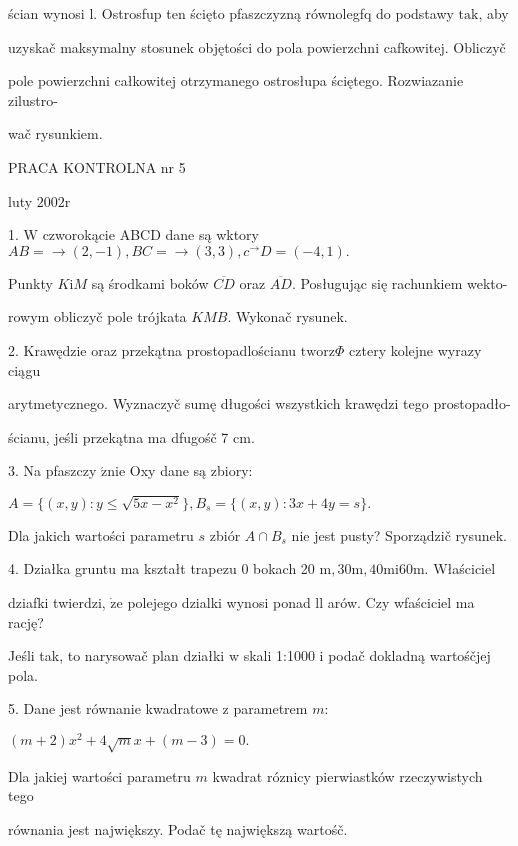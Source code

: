 \documentclass[a4paper,12pt]{article}
\begin{document}
ścian wynosi l. Ostrosfup ten ścięto pfaszczyzną równolegfq do podstawy $\mathrm{t}\mathrm{a}\mathrm{k}$, aby

uzyskač maksymalny stosunek objętości do pola powierzchni cafkowitej. Obliczyč

pole powierzchni całkowitej otrzymanego ostrosłupa ściętego. Rozwiazanie zilustro-

wač rysunkiem.





PRACA KONTROLNA nr 5

luty $2002\mathrm{r}$

1. $\mathrm{W}$ czworokącie ABCD dane są wktory $AB=\rightarrow(2,-1), BC=\rightarrow(3,3), c^{\rightarrow}D=(-4,1).$

Punkty $K\mathrm{i}M$ są środkami boków $\overline{CD}$ oraz $\overline{AD}$. Posługując się rachunkiem wekto-

rowym obliczyč pole trójkata $KMB$. Wykonač rysunek.

2. Krawędzie oraz przekątna prostopadlościanu $\mathrm{t}\mathrm{w}\mathrm{o}\mathrm{r}\mathrm{z}\Phi$ cztery kolejne wyrazy ciągu

arytmetycznego. Wyznaczyč sumę długości wszystkich krawędzi tego prostopadło-

ścianu, jeśli przekątna ma dfugośč 7 cm.

3. Na pfaszczy $\acute{\mathrm{z}}\mathrm{n}\mathrm{i}\mathrm{e}$ Oxy dane są zbiory:

$A=\{(x,y):y\leq\sqrt{5x-x^{2}}\},B_{s}=\{(x,y):3x+4y=s\}.$

Dla jakich wartości parametru $s$ zbiór $A\cap B_{s}$ nie jest pusty? Sporządzič rysunek.

4. Działka gruntu ma kształt trapezu $0$ bokach 20 $\mathrm{m}, 30\mathrm{m}, 40\mathrm{m}\mathrm{i}60\mathrm{m}$. Właściciel

dziafki twierdzi, $\dot{\mathrm{z}}\mathrm{e}$ polejego dzialki wynosi ponad ll arów. Czy wfaściciel ma rację?

Jeśli tak, to narysowač plan działki $\mathrm{w}$ skali 1:1000 $\mathrm{i}$ podač dokladną wartośčjej pola.

5. Dane jest równanie kwadratowe $\mathrm{z}$ parametrem $m$:

$(m+2)x^{2}+4\sqrt{m}x+(m-3)=0.$

Dla jakiej wartości parametru $m$ kwadrat róznicy pierwiastków rzeczywistych tego

równania jest największy. Podač tę największą wartośč.
\end{document}
